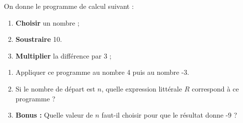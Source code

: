 \documentclass[a4paper]{book}
\begin{document}
    
    \begin{exercice}
    On donne le programme de calcul suivant : 
    
    \begin{center}
        \begin{minipage}{0.6\textwidth}
            \begin{tcolorbox}[colback=gray!5, colframe=gray!30, arc=2mm, boxrule=0.5pt, left=10pt]
                \begin{enumerate}[label=\color{blue!70!black}\faArrowRight, leftmargin=*]
                    \item \textbf{Choisir} un nombre ;
                    \item \textbf{Soustraire} 10.
                    \item \textbf{Multiplier} la différence par 3 ;
                \end{enumerate}
            \end{tcolorbox}
        \end{minipage}
    \end{center}
    
    \begin{enumerate}
        \item Appliquer ce programme au nombre 4 puis au nombre -3.
        \item Si le nombre de départ est $n$, quelle expression littérale $R$ correspond à ce programme ? \\        
        \item \textbf{Bonus :} Quelle valeur de $n$ faut-il choisir pour que le résultat donne -9 ?
    \end{enumerate}
    \end{exercice}
\end{document}
